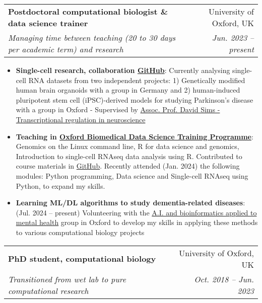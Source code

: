\documentclass[a4paper,11pt]{article}
\makeatletter
\newcommand{\resumeItem}[2]{
  \item\small{
    \textbf{#1}{: #2 \vspace{-2pt}}
  }
}
\newcommand{\resumeSubheading}[4]{
  \vspace{-1pt}\item
    \begin{tabular*}{0.97\textwidth}[t]{l@{\extracolsep{\fill}}r}
      \textbf{#1} & #2 \\
      \textit{\small#3} & \textit{\small #4} \\
    \end{tabular*}\vspace{-5pt}
}
\newcommand{\resumeItemListStart}{\begin{itemize}}
\newcommand{\resumeItemListEnd}{\end{itemize}\vspace{-5pt}}
\makeatother
\begin{document}
        \resumeSubheading
        {Postdoctoral computational biologist \& data science trainer}{University of Oxford, UK}{Managing time between teaching (20 to 30 days per academic term) and research}{Jun. 2023 -- present}
            \resumeItemListStart
                \resumeItem{Single-cell research, collaboration \href{https://github.com/liezeltamon/utils/tree/main/R}{GitHub}}{Currently analysing single-cell RNA datasets from two independent projects: 1) Genetically modified human brain organoids with a group in Germany and 2) human-induced pluripotent stem cell (iPSC)-derived models for studying Parkinson's disease with a group in Oxford - Supervised by \href{https://www.rdm.ox.ac.uk/people/david-sims}{Assoc. Prof. David Sims - Transcriptional regulation in neuroscience}}
                \resumeItem{Teaching in \href{https://www.imm.ox.ac.uk/research/units-and-centres/mrc-wimm-centre-for-computational-biology/training/oxford-biomedical-data-science-training-programme}{Oxford Biomedical Data Science Training Programme}}{Genomics on the Linux command line, R for data science and genomics, Introduction to single-cell RNAseq data analysis using R. Contributed to course materials in {\href{https://github.com/kevinrue/OBDS_slides}{GitHub}}. Recently attended (Jan. 2024) the following modules: Python programming, Data science and Single-cell RNAseq using Python, to expand my skills.}
                 \resumeItem{Learning ML/DL algorithms to study dementia-related diseases}{ (Jul. 2024 -- present) Volunteering with the \href{https://www.psych.ox.ac.uk/team/alejo-nevado-holgado}{A.I. and bioinformatics applied to mental health} group in Oxford to develop my skills in applying these methods to various computational biology projects}
            \resumeItemListEnd
        \resumeSubheading
        {PhD student, computational biology}{University of Oxford, UK}{Transitioned from wet lab to pure computational research}{Oct. 2018 -- Jun. 2023}
\end{document}
